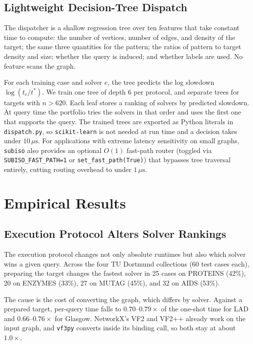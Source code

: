 \documentclass[11pt,a4paper]{article}
\begin{document}
\subsection{Lightweight Decision-Tree Dispatch}

The dispatcher is a shallow regression tree over ten features that take constant time to compute: the number of vertices, number of edges, and density of the target; the same three quantities for the pattern; the ratios of pattern to target density and size; whether the query is induced; and whether labels are used. No feature scans the graph.

For each training case and solver $e$, the tree predicts the log slowdown $\log(t_e / t^*)$. We train one tree of depth 6 per protocol, and separate trees for targets with $n > 620$. Each leaf stores a ranking of solvers by predicted slowdown. At query time the portfolio tries the solvers in that order and uses the first one that supports the query. The trained trees are exported as Python literals in \texttt{dispatch.py}, so \texttt{scikit-learn} is not needed at run time and a decision takes under $10\,\mu\text{s}$. For applications with extreme latency sensitivity on small graphs, \texttt{subiso} also provides an optional $O(1)$ fast-path router (toggled via \texttt{SUBISO\_FAST\_PATH=1} or \texttt{set\_fast\_path(True)}) that bypasses tree traversal entirely, cutting routing overhead to under $1\,\mu\text{s}$.

\section{Empirical Results}

\subsection{Execution Protocol Alters Solver Rankings}

The execution protocol changes not only absolute runtimes but also which solver wins a given query. Across the four TU Dortmund collections (60 test cases each), preparing the target changes the fastest solver in 25 cases on PROTEINS (42\%), 20 on ENZYMES (33\%), 27 on MUTAG (45\%), and 32 on AIDS (53\%).

The cause is the cost of converting the graph, which differs by solver. Against a prepared target, per-query time falls to $0.70\text{--}0.79\times$ of the one-shot time for LAD and $0.66\text{--}0.76\times$ for Glasgow. NetworkX's VF2 and VF2++ already work on the input graph, and \texttt{vf3py} converts inside its binding call, so both stay at about $1.0\times$.
\end{document}
